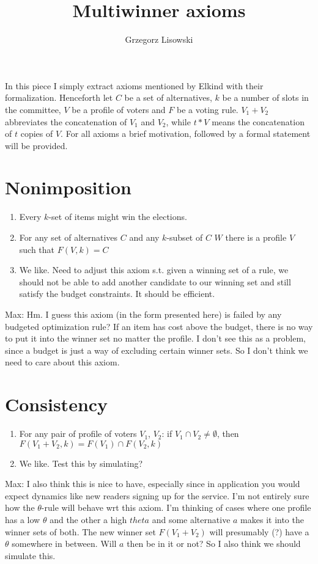 \documentclass{article}
\title{Multiwinner axioms}
\author{Grzegorz Lisowski}
\begin{document}
\maketitle
In this piece I simply extract axioms mentioned by Elkind with their formalization. Henceforth let $C$ be a set of alternatives, $k$ be a number of slots in the committee, $V$ be a profile of voters and $F$ be a voting rule. $V_1 + V_2$ abbreviates the concatenation of $V_1$ and $V_2$, while $t*V$ means the concatenation of $t$ copies of $V$. For all axioms a brief motivation, followed by a formal statement will be provided.
\section{Nonimposition}
\begin{enumerate}
\item Every $k$-set of items might win the elections.
\item For any set of alternatives $C$ and any $k$-subset of $C$ $W$ there is a profile $V$ such that $F(V, k)=C$
\item We like. Need to adjust this axiom s.t. given a winning set of a rule, we should not be able to add another candidate to our winning set and still satisfy the budget constraints. It should be efficient.

\end{enumerate}

Max: {Hm. I guess this axiom (in the form presented here) is failed by any budgeted optimization rule? If an item has cost above the budget, there is no way to put it into the winner set no matter the profile. I don't see this as a problem, since a budget is just a way of excluding certain winner sets. So I don't think we need to care about this axiom.}

\section{Consistency}
\begin{enumerate}
\item For any pair of profile of voters $V_1$, $V_2$: if $V_1 \cap V_2 \neq \emptyset$, then $F(V_1+V_2, k)=F(V_1) \cap F(V_2, k)$
\item We like. Test this by simulating?

\end{enumerate}

Max: {I also think this is nice to have, especially since in application you would expect dynamics like new readers signing up for the service. I'm not entirely sure how the $\theta$-rule will behave wrt this axiom. I'm thinking of cases where one profile has a low $\theta$ and the other a high $theta$ and some alternative $a$ makes it into the winner sets of both. The new winner set  $F(V_1+V_2)$ will presumably (?) have a $\theta$ somewhere in between. Will $a$ then be in it or not? So I also think we should simulate this.}
\end{document}
